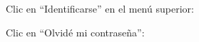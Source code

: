 \documentclass[12pt, spanish]{article}
\begin{document}
    \begin{steps}

        \item Clic en ``Identificarse'' en el menú superior:

            \medskip
            \begin{minipage}[t]{\linewidth}
            \raggedright
        \end{minipage}

        \item Clic en ``Olvidé mi contraseña'':

            \medskip
            \begin{minipage}[t]{\linewidth}
            \raggedright
        \end{minipage}


\end{steps}
\end{document}
